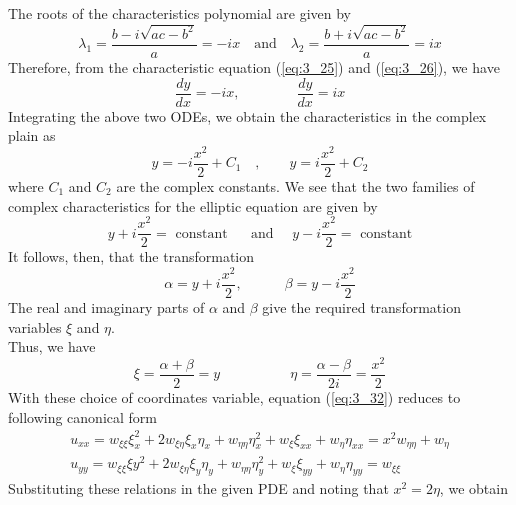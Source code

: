 \documentclass[11pt]{report}
\newcommand{\NI}{\noindent}
\newcommand{\sps}{\\[0.2cm]}
\newcommand{\refn}[1]{(\ref{#1})}
\newcommand{\refx}[1]{\refn{eq:#1}}
\begin{document}
	\NI The roots of the characteristics polynomial are given by
	\begin{equation}
		\lambda_1 = \frac{b-i\sqrt{ac-b^2}}{a} =-ix \text{ ~~and~~ } \lambda_2=\frac{b+i\sqrt{ac-b^2}}{a}=ix\label{ex:3_4_3} \tag{3}
	\end{equation}
	Therefore, from the characteristic equation \refx{3_25} and \refx{3_26}, we have
	\begin{equation}
		\frac{dy}{dx}=-ix,\qquad\qquad \frac{dy}{dx} = ix\label{ex:3_4_4} \tag{4}
	\end{equation}
	Integrating the above two ODEs, we obtain the characteristics in the complex plain as
	\begin{equation}
		y = -i\frac{x^2}{2}+C_1\quad , \qquad y=i\frac{x^2}{2}+C_2\label{ex:3_4_5} \tag{5}
	\end{equation}
	where $C_1$ and $C_2$ are the complex constants. We see that the two families of complex characteristics for the elliptic equation are given by 
	\begin{equation}
		y + i\frac{x^2}{2} = \text{ constant }\quad \text{ and } \quad y- i\frac{x^2}{2}= \text{ constant}\label{ex:3_4_6} \tag{6}
	\end{equation}
	It follows, then, that the transformation
	\begin{equation}
			\alpha = y + i\frac{x^2}{2}, \qquad \quad \beta = y- i\frac{x^2}{2}\label{ex:3_4_7} \tag{7}
	\end{equation}
	The real and imaginary parts of $\alpha$ and $\beta$ give the required transformation variables $\xi$ and $\eta$.\sps
	Thus, we have
	\begin{equation}
		\xi = \frac{\alpha + \beta}{2} = y \qquad\qquad\quad \eta = \frac{\alpha - \beta}{2i} =\frac{x^2}{2} \label{ex:3_4_8} \tag{8}
	\end{equation}
	With these choice of coordinates variable, equation \refx{3_32} reduces to following canonical form
	\begin{equation}
		\begin{array}{l}
			u_{xx} = w_{\xi\xi}\xi_x^2 + 2w_{\xi\eta}\xi_x\eta_x + w_{\eta\eta}\eta_x^2 + w_{\xi}\xi_{xx} + w_\eta\eta_{xx} = x^2w_{\eta\eta} + w_\eta\\
			u_{yy} = w_{\xi\xi}\xi y^2 + 2w_{\xi\eta}\xi_y \eta_y + w_{\eta\eta}\eta_y^2 + w_{\xi}\xi_{yy} + w_\eta\eta_{yy}=w_{\xi\xi}
		\end{array}\label{ex:3_4_9} \tag{9}
	\end{equation}
	Substituting these relations in the given PDE and noting that $x^2=2\eta$, we obtain
\end{document}

